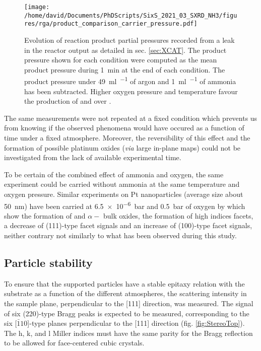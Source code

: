 \begin{figure}[!htb]
    \centering
    \texttt{[image: /home/david/Documents/PhDScripts/SixS\_2021\_03\_SXRD\_NH3/figures/rga/product\_comparison\_carrier\_pressure.pdf]}
    \caption{
        Evolution of reaction product partial pressures  recorded from a leak in the reactor output as detailed in sec. \ref{sec:XCAT}.
        The product pressure shown for each condition were computed as the mean product pressure during \qty{1}{\minute} at the end of each condition.
        The product pressure under \qty{49}{\ml\per\min} of argon and \qty{1}{\ml\per\min} of ammonia has been subtracted.
        Higher oxygen pressure and temperature favour the production of \nitrousoxide and \nitricoxide over \nitrogen.
    }
    \label{fig:RGASXRDNanoparticlesComparison}
\end{figure}

The same measurements were not repeated at a fixed condition which prevents us from knowing if the observed phenomena would have occured as a function of time under a fixed atmosphere.
Moreover, the reversibility of this effect and the formation of possible platinum oxides (\textit{via} large in-plane maps) could not be investigated from the lack of available experimental time.

To be certain of the combined effect of ammonia and oxygen, the same experiment could be carried without ammonia at the same temperature and oxygen pressure.
Similar experiments on Pt nanoparticles (average size about \qty{50}{\nm}) have been carried at \qty{6.5e-6}{\bar} and \qty{0.5}{\bar} of oxygen by \cite{Hejral2013} which show the formation of  and $\alpha-$ bulk oxides, the formation of high indices facets, a decrease of (111)-type facet signals and an increase of (100)-type facet signals, neither contrary not similarly to what has been observed during this study.

\subsection{Particle stability}

To ensure that the  supported particles have a stable epitaxy relation with the substrate as a function of the different atmospheres, the scattering intensity in the sample plane, perpendicular to the [111] direction, was measured.
The signal of six (220)-type Bragg peaks is expected to be measured, corresponding to the six [$\bar{1}10$]-type planes perpendicular to the [111] direction (fig. \ref{fig:StereoTop}).
The h, k, and l Miller indices must have the same parity for the Bragg reflection to be allowed for face-centered cubic crystals.

